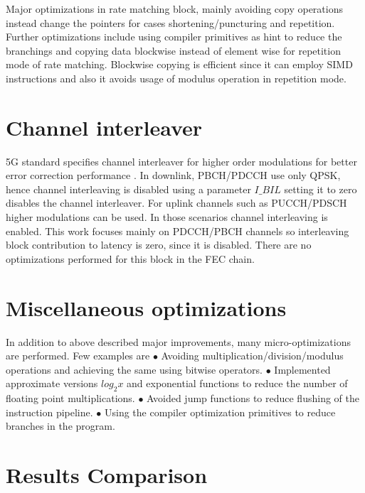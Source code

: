 Major optimizations in rate matching block, mainly avoiding copy operations instead change the pointers for cases shortening/puncturing and repetition. Further optimizations include using compiler primitives as hint to reduce the branchings and copying data blockwise instead of element wise for repetition mode of rate matching. Blockwise copying is efficient since it can employ SIMD instructions and also it avoids usage of modulus operation in repetition mode.

\section{Channel interleaver}
5G standard specifies channel interleaver for higher order modulations for better error correction performance \cite{3gpp.TSG-RAN_WG1}. In downlink, PBCH/PDCCH use only QPSK, hence channel interleaving is disabled using a parameter $I\_BIL$ setting it to zero disables the channel interleaver. For uplink channels such as PUCCH/PDSCH higher modulations can be used. In those scenarios channel interleaving is enabled. This work focuses mainly on PDCCH/PBCH channels so interleaving block contribution to latency is zero, since it is disabled. There are no optimizations performed for this block in the FEC chain.

\section{Miscellaneous optimizations}
In addition to above described major improvements, many micro-optimizations are performed. Few examples are \newline
$\bullet $ Avoiding multiplication/division/modulus operations and achieving the same using bitwise operators.\newline
$\bullet $ Implemented approximate versions $log_{2}x$ and exponential functions to reduce the number of floating point multiplications.\newline
$\bullet $ Avoided jump functions to reduce flushing of the instruction pipeline.\newline
$\bullet $ Using the compiler optimization primitives to reduce branches in the program.\newline

\section{Results Comparison}

